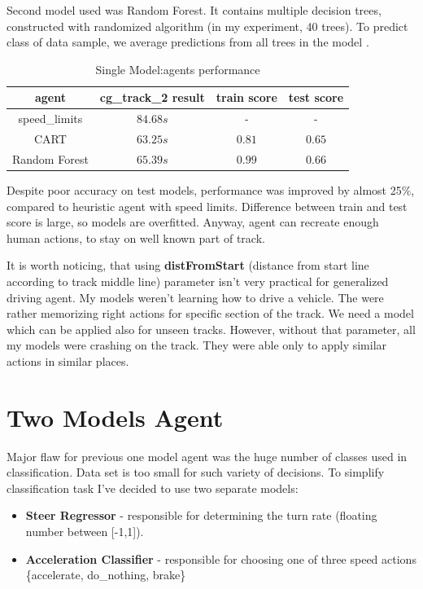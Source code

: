 \documentclass[declaration,shortabstract,english,inz]{iithesis}
\begin{document}
Second model used was Random Forest.
It contains multiple decision trees, constructed with randomized algorithm (in my experiment, 40 trees).
To predict class of data sample, we average predictions from all trees in the model \cite{Introduction_ML}.


\begin{table}[h]
    \centering
    \begin{tabular}{ |c|c|c|c|}
          \hline
          agent & cg\_track\_2 result & train score & test score \\
          \hline
          speed\_limits & $84.68s$ & - & -\\
          \hline
          CART &  $63.25s$ & $0.81$ & $0.65$\\
          \hline
          Random Forest & $65.39s$ & $0.99$ & $0.66$ \\
          \hline
          
        \end{tabular}
        \caption{Single Model:agents performance}
        \label{tab:single_clp_tree}

\end{table}


Despite poor accuracy on test models, performance was improved by almost 25\%, compared to heuristic agent with speed limits.
Difference between train and test score is large, so models are overfitted.
Anyway, agent can recreate enough human actions, to stay on well known part of track.


It is worth noticing, that using \textbf{distFromStart} (distance from start line according to track middle line) parameter isn't very practical for generalized driving agent.
My models weren't learning how to drive a vehicle.
The were rather memorizing right actions for specific section of the track.
We need a model which can be applied also for unseen tracks.
However, without that parameter, all my models were crashing on the track.
They were able only to apply similar actions in similar places.

\section{Two Models Agent}

Major flaw for previous one model agent was the huge number of classes used in classification.
Data set is too small for such variety of decisions.
To simplify classification task I've decided to use two separate models: 

\begin{itemize}
    \item \textbf{Steer Regressor} - responsible for determining the turn rate (floating number between [-1,1]).
    \item \textbf{Acceleration Classifier} - responsible for choosing one of three speed actions \{accelerate, do\_nothing, brake\}
\end{itemize}
\end{document}
